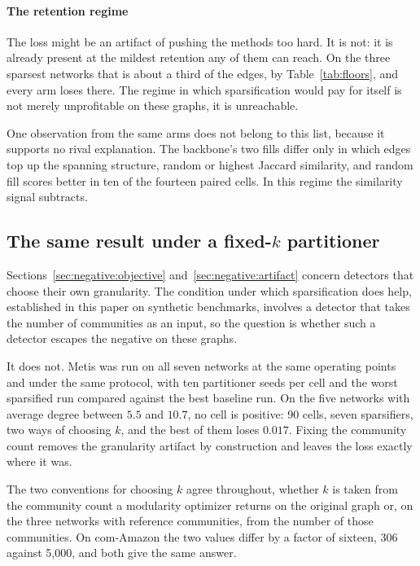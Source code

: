 \paragraph{The retention regime}
The loss might be an artifact of pushing the methods too hard. It is not: it is
already present at the mildest retention any of them can reach. On the three
sparsest networks that is about a third of the edges, by Table~\ref{tab:floors},
and every arm loses there. The regime in which sparsification would pay for itself
is not merely unprofitable on these graphs, it is unreachable.

One observation from the same arms does not belong to this list, because it
supports no rival explanation. The backbone's two fills differ only in which edges
top up the spanning structure, random or highest Jaccard similarity, and random
fill scores better in ten of the fourteen paired cells. In this regime the
similarity signal subtracts.

\subsection{The same result under a fixed-\texorpdfstring{$k$}{k} partitioner}\label{sec:negative:metis}

Sections~\ref{sec:negative:objective} and~\ref{sec:negative:artifact} concern
detectors that choose their own granularity. The condition under which
sparsification does help, established in this paper on synthetic benchmarks,
involves a detector that takes the number of communities as an input, so the
question is whether such a detector escapes the negative on these graphs.

It does not. Metis was run on all seven networks at the same operating points and
under the same protocol, with ten partitioner seeds per cell and the worst
sparsified run compared against the best baseline run. On the five networks with
average degree between $5.5$ and $10.7$, no cell is positive: 90 cells, seven
sparsifiers, two ways of choosing $k$, and the best of them loses $0.017$. Fixing
the community count removes the granularity artifact by construction and leaves
the loss exactly where it was.

The two conventions for choosing $k$ agree throughout, whether $k$ is taken from
the community count a modularity optimizer returns on the original graph or, on
the three networks with reference communities, from the number of those
communities. On com-Amazon the two values differ by a factor of sixteen, 306
against 5,000, and both give the same answer.

